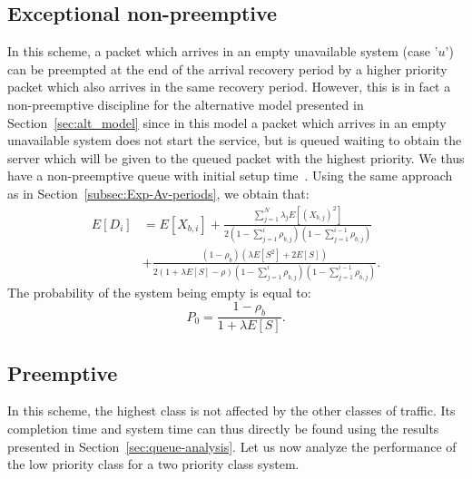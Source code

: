 \documentclass[11pt,journal,oneside,onecolumn,draftclsnofoot]{IEEEtran}
\begin{document}
 
\subsection{{Exceptional non-preemptive}}
\label{sec:except_non_preempt}

In this scheme, a packet which arrives in an empty unavailable system (case '$u$') can be preempted at the end of the arrival recovery period by a higher priority packet which also arrives in the same recovery period. However, this is in fact a non-preemptive discipline for the alternative model presented in Section~\ref{sec:alt_model} since in this model a packet which arrives in an empty unavailable system does not start the service, but is queued waiting to obtain the server which will be given to the queued packet with the highest priority.
We thus have a non-preemptive queue with initial setup time~\cite{takagi91}. Using the same approach as in Section~\ref{subsec:Exp-Av-periods}, we obtain that:
\begin{align}
E[D_i]&=E[X_{b,i}]+\frac{\sum_{j=1}^{N}{\lambda}_j E[({X_{b,j}})^2]}{2{(1-\sum_{j=1}^{i}{\rho_{b,j}})(1-\sum_{j=1}^{i-1}{\rho_{b,j}})}} \nonumber \\
&+\frac{(1-{\rho_b})(\lambda E[S^2]+2E[S])}{2(1+\lambda E[S]-\rho)(1-\sum_{j=1}^{i}{\rho_{b,j}})(1-\sum_{j=1}^{i-1}{\rho_{b,j}})}.
\label{eq:waiting-Exnonpr-Exp}
\end{align}
The probability of the system being empty is equal to: 
\begin{equation}
P_0=\frac{1-\rho_b}{1+\lambda E[S]}.
\label{eq:P0-ENP}
\end{equation}

\subsection{{Preemptive}}
\label{sec:preempt}

In this scheme, the highest class is not affected by the other classes of traffic. Its completion time and system time can thus directly be found using the results presented in Section~\ref{sec:queue-analysis}. Let us now analyze the performance of the low priority class for a two priority class system.
\end{document}
